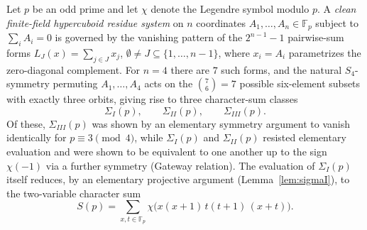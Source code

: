 \documentclass[11pt]{amsart}
\theoremstyle{definition}
\newcommand{\Fp}{\mathbb{F}_p}
\begin{document}
Let $p$ be an odd prime and let $\chi$ denote the Legendre symbol modulo $p$. A \emph{clean finite-field hypercuboid residue system} on $n$ coordinates $A_1,\dots,A_n\in\Fp$ subject to $\sum_i A_i=0$ is governed by the vanishing pattern of the $2^{n-1}-1$ pairwise-sum forms $L_J(x)=\sum_{j\in J}x_j$, $\emptyset\neq J\subseteq\{1,\dots,n-1\}$, where $x_i=A_i$ parametrizes the zero-diagonal complement. For $n=4$ there are $7$ such forms, and the natural $S_4$-symmetry permuting $A_1,\dots,A_4$ acts on the $\binom{7}{6}=7$ possible six-element subsets with exactly three orbits, giving rise to three character-sum classes
\[
\Sigma_I(p),\qquad \Sigma_{II}(p),\qquad \Sigma_{III}(p).
\]
Of these, $\Sigma_{III}(p)$ was shown by an elementary symmetry argument to vanish identically for $p\equiv3\pmod4$, while $\Sigma_I(p)$ and $\Sigma_{II}(p)$ resisted elementary evaluation and were shown to be equivalent to one another up to the sign $\chi(-1)$ via a further symmetry (Gateway relation). The evaluation of $\Sigma_I(p)$ itself reduces, by an elementary projective argument (Lemma~\ref{lem:sigmaI}), to the two-variable character sum
\[
S(p) = \sum_{x,t\in\Fp}\chi\bigl(x(x+1)\,t(t+1)\,(x+t)\bigr).
\]
\end{document}
